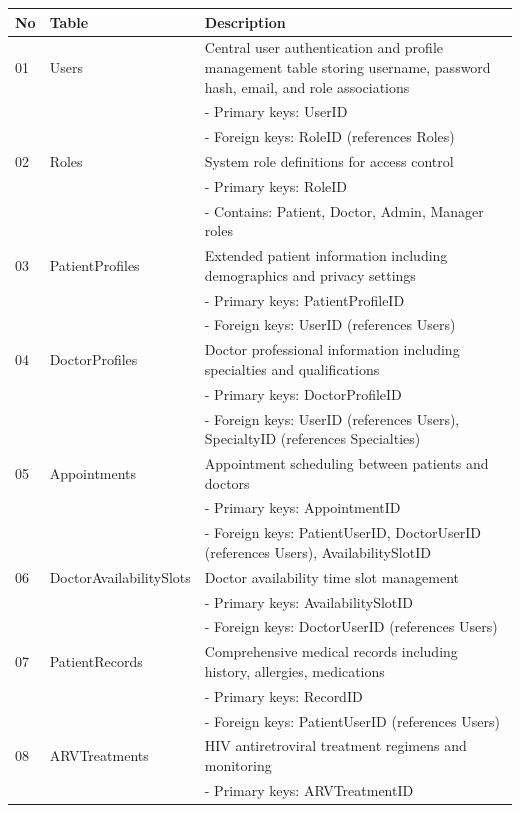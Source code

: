 \documentclass[12pt,a4paper]{article}
\begin{document}
\begin{longtable}{|p{1cm}|p{3cm}|p{10cm}|}
\hline
\textbf{No} & \textbf{Table} & \textbf{Description} \\
\hline
01 & Users & Central user authentication and profile management table storing username, password hash, email, and role associations \\
& & - Primary keys: UserID \\
& & - Foreign keys: RoleID (references Roles) \\
\hline
02 & Roles & System role definitions for access control \\
& & - Primary keys: RoleID \\
& & - Contains: Patient, Doctor, Admin, Manager roles \\
\hline
03 & PatientProfiles & Extended patient information including demographics and privacy settings \\
& & - Primary keys: PatientProfileID \\
& & - Foreign keys: UserID (references Users) \\
\hline
04 & DoctorProfiles & Doctor professional information including specialties and qualifications \\
& & - Primary keys: DoctorProfileID \\
& & - Foreign keys: UserID (references Users), SpecialtyID (references Specialties) \\
\hline
05 & Appointments & Appointment scheduling between patients and doctors \\
& & - Primary keys: AppointmentID \\
& & - Foreign keys: PatientUserID, DoctorUserID (references Users), AvailabilitySlotID \\
\hline
06 & DoctorAvailabilitySlots & Doctor availability time slot management \\
& & - Primary keys: AvailabilitySlotID \\
& & - Foreign keys: DoctorUserID (references Users) \\
\hline
07 & PatientRecords & Comprehensive medical records including history, allergies, medications \\
& & - Primary keys: RecordID \\
& & - Foreign keys: PatientUserID (references Users) \\
\hline
08 & ARVTreatments & HIV antiretroviral treatment regimens and monitoring \\
& & - Primary keys: ARVTreatmentID \\

\end{longtable}
\end{document}
